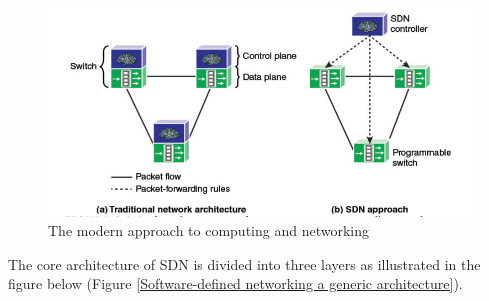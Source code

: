 \documentclass[
  oneside,
  11pt, a4paper,
  footinclude=true,
  headinclude=true,
  cleardoublepage=empty
]{scrbook}
\begin{document}
\begin{figure}[H]
\begin{center}
    \includegraphics[width=1\textwidth]{img/sdna.png}
\end{center}
  \caption{The modern approach to computing and networking ~\cite{stallings2015foundations}}
\centering
\label{The modern approach to computing and networking}
\end{figure}


The core architecture of SDN is divided into three layers as illustrated in the figure below (Figure \ref{Software-defined networking a generic architecture}).\par
\end{document}
